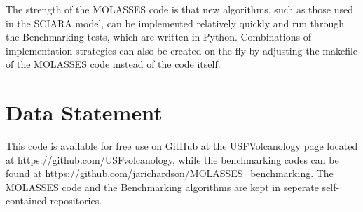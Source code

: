 \documentclass[12pt,letter]{article}
\begin{document}
	The strength of the MOLASSES code is that new algorithms, such as those used in the SCIARA model, can be implemented relatively quickly and run through the Benchmarking tests, which are written in Python. Combinations of implementation strategies can also be created on the fly by adjusting the makefile of the MOLASSES code instead of the code itself.
	
\section{Data Statement}
This code is available for free use on GitHub at the USFVolcanology page located at https://github.com/USFvolcanology, while the benchmarking codes can be found at https://github.com/jarichardson/MOLASSES\_benchmarking. The MOLASSES code and the Benchmarking algorithms are kept in seperate self-contained repositories.





\end{document}
